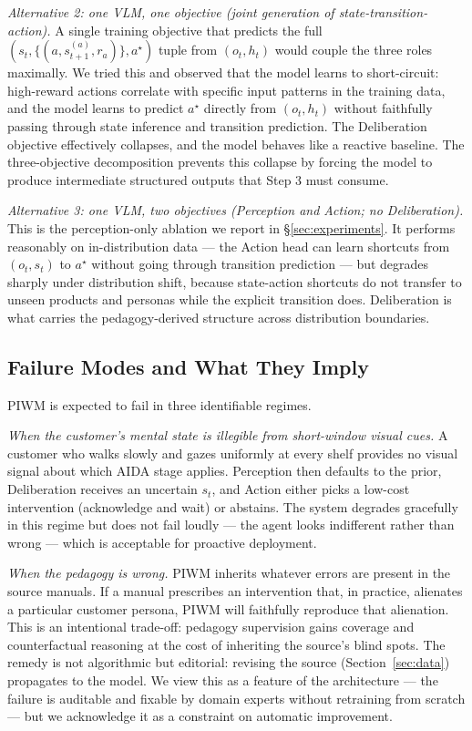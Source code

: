 \documentclass{article}
\begin{document}
\textit{Alternative 2: one VLM, one objective (joint generation of state-transition-action).}
A single training objective that predicts the full $(s_t, \{(a, s_{t+1}^{(a)}, r_a)\}, a^\star)$ tuple from $(o_t, h_t)$ would couple the three roles maximally. We tried this and observed that the model learns to short-circuit: high-reward actions correlate with specific input patterns in the training data, and the model learns to predict $a^\star$ directly from $(o_t, h_t)$ without faithfully passing through state inference and transition prediction. The Deliberation objective effectively collapses, and the model behaves like a reactive baseline. The three-objective decomposition prevents this collapse by forcing the model to produce intermediate structured outputs that Step 3 must consume.

\textit{Alternative 3: one VLM, two objectives (Perception and Action; no Deliberation).}
This is the perception-only ablation we report in §\ref{sec:experiments}. It performs reasonably on in-distribution data --- the Action head can learn shortcuts from $(o_t, s_t)$ to $a^\star$ without going through transition prediction --- but degrades sharply under distribution shift, because state-action shortcuts do not transfer to unseen products and personas while the explicit transition does. Deliberation is what carries the pedagogy-derived structure across distribution boundaries.

\subsection{Failure Modes and What They Imply}
\label{sec:method:failure}

PIWM is expected to fail in three identifiable regimes.

\textit{When the customer's mental state is illegible from short-window visual cues.}
A customer who walks slowly and gazes uniformly at every shelf provides no visual signal about which AIDA stage applies. Perception then defaults to the prior, Deliberation receives an uncertain $s_t$, and Action either picks a low-cost intervention (acknowledge and wait) or abstains. The system degrades gracefully in this regime but does not fail loudly --- the agent looks indifferent rather than wrong --- which is acceptable for proactive deployment.

\textit{When the pedagogy is wrong.}
PIWM inherits whatever errors are present in the source manuals. If a manual prescribes an intervention that, in practice, alienates a particular customer persona, PIWM will faithfully reproduce that alienation. This is an intentional trade-off: pedagogy supervision gains coverage and counterfactual reasoning at the cost of inheriting the source's blind spots. The remedy is not algorithmic but editorial: revising the source (Section~\ref{sec:data}) propagates to the model. We view this as a feature of the architecture --- the failure is auditable and fixable by domain experts without retraining from scratch --- but we acknowledge it as a constraint on automatic improvement.
\end{document}
